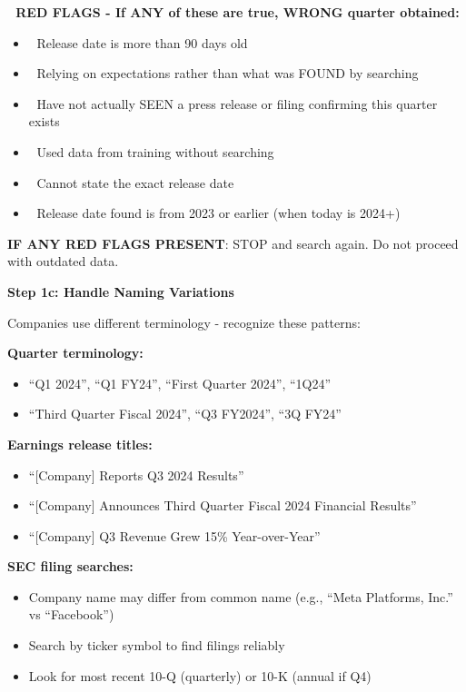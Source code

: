 \documentclass[11pt]{article}
\begin{document}
\textbf{🚨 RED FLAGS - If ANY of these are true, WRONG quarter obtained:}

\begin{itemize}[leftmargin=*,itemsep=2pt,topsep=2pt]
\item {} 🚨 Release date is more than 90 days old
\item {} 🚨 Relying on expectations rather than what was FOUND by searching
\item {} 🚨 Have not actually SEEN a press release or filing confirming this quarter exists
\item {} 🚨 Used data from training without searching
\item {} 🚨 Cannot state the exact release date
\item {} 🚨 Release date found is from 2023 or earlier (when today is 2024+)
\end{itemize}

\textbf{IF ANY RED FLAGS PRESENT}: STOP and search again. Do not proceed with outdated data.


\textbf{Step 1c: Handle Naming Variations}


Companies use different terminology - recognize these patterns:


\textbf{Quarter terminology:}

\begin{itemize}[leftmargin=*,itemsep=2pt,topsep=2pt]
\item {} ``Q1 2024'', ``Q1 FY24'', ``First Quarter 2024'', ``1Q24''
\item {} ``Third Quarter Fiscal 2024'', ``Q3 FY2024'', ``3Q FY24''
\end{itemize}

\textbf{Earnings release titles:}

\begin{itemize}[leftmargin=*,itemsep=2pt,topsep=2pt]
\item {} ``[Company] Reports Q3 2024 Results''
\item {} ``[Company] Announces Third Quarter Fiscal 2024 Financial Results''
\item {} ``[Company] Q3 Revenue Grew 15\% Year-over-Year''
\end{itemize}

\textbf{SEC filing searches:}

\begin{itemize}[leftmargin=*,itemsep=2pt,topsep=2pt]
\item {} Company name may differ from common name (e.g., ``Meta Platforms, Inc.'' vs ``Facebook'')
\item {} Search by ticker symbol to find filings reliably
\item {} Look for most recent 10-Q (quarterly) or 10-K (annual if Q4)
\end{itemize}
\end{document}
